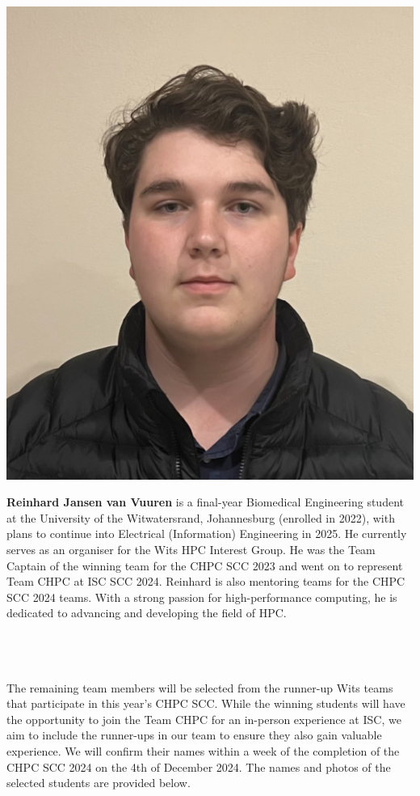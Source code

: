 \documentclass[10pt, onecolumn]{IEEEtran}
\begin{document}
\begin{minipage}{0.2\textwidth}
  \includegraphics[width=\textwidth]{reinhard_bio.png}
\end{minipage}
\hspace{0.02\textwidth} %
\begin{minipage}{0.65\textwidth}
\textbf{Reinhard Jansen van Vuuren} is a final-year Biomedical Engineering student at the University of the Witwatersrand, Johannesburg (enrolled in 2022), with plans to continue into Electrical (Information) Engineering in 2025. He currently serves as an organiser for the Wits HPC Interest Group. He was the Team Captain of the winning team for the CHPC SCC 2023 and went on to represent Team CHPC at ISC SCC 2024. Reinhard is also mentoring teams for the CHPC SCC 2024 teams. With a strong passion for high-performance computing, he is dedicated to advancing and developing the field of HPC.
\end{minipage}
\\\\\\
\noindent
The remaining team members will be selected from the runner-up Wits teams that participate in this year's CHPC SCC. While the winning students will have the opportunity to join the Team CHPC for an in-person experience at ISC, we aim to include the runner-ups in our team to ensure they also gain valuable experience. We will confirm their names within a week of the completion of the CHPC SCC 2024 on the 4th of December 2024. The names and photos of the selected students are provided below.
\end{document}
